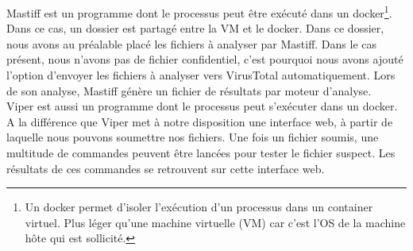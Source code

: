\documentclass{svjour3}
\begin{document}
Mastiff est un programme dont le processus peut être exécuté dans un docker\footnote{Un docker permet d'isoler l'exécution d'un processus dans un container virtuel. Plus léger qu'une machine virtuelle (VM) car c'est l'OS de la machine hôte qui est sollicité.}. Dans ce cas, un dossier est partagé entre la VM et le docker. Dans ce dossier, nous avons au préalable placé les fichiers à analyser par Mastiff. Dans le cas présent, nous n'avons pas de fichier confidentiel, c'est pourquoi nous avons ajouté l'option d'envoyer les fichiers à analyser vers VirusTotal automatiquement. Lors de son analyse, Mastiff génère un fichier de résultats par moteur d'analyse.\\
$ $\\
Viper est aussi un programme dont le processus peut s’exécuter dans un docker. A la différence que Viper met à notre disposition une interface web, à partir de laquelle nous pouvons soumettre nos fichiers. Une fois un fichier soumis, une multitude de commandes peuvent être lancées pour tester le fichier suspect. Les résultats de ces commandes se retrouvent sur cette interface web.\\
\end{document}
